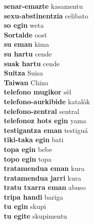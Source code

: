 \textbf{ senar-emazte  } kasamentu \\
\textbf{ sexu-abstinentzia  } celibato \\
\textbf{ so egin  } weta \\
\textbf{ Sortalde  } oost \\
\textbf{ su eman  } kima \\
\textbf{ su hartu  } cende \\
\textbf{ suak hartu  } cende \\
\textbf{ Suitza  } Suisa \\
\textbf{ Taiwan  } China \\
\textbf{ telefono mugikor  } sèl \\
\textbf{ telefono-aurkibide  } katalòk \\
\textbf{ telefono-zentral  } sentral \\
\textbf{ telefonoz hots egin  } yama \\
\textbf{ testigantza eman  } testiguá \\
\textbf{ tiki-taka egin  } bati \\
\textbf{ topa egin  } bebe \\
\textbf{ topo egin  } topa \\
\textbf{ tratamendua eman  } kura \\
\textbf{ tratamendua jarri  } kura \\
\textbf{ tratu txarra eman  } abuso \\
\textbf{ tripa handi  } bariga \\
\textbf{ tu egin  } skupi \\
\textbf{ tu egite  } skupimentu \\
